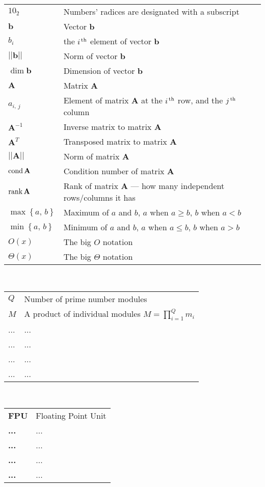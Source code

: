 \begin{tabular}{ll}
$10_2$ & Numbers' radices are designated with a subscript \\
${\mathbf b}$ & Vector $\mathbf b$\\
$b_{i}$ & the $i^{\,{\rm th}}$ element of vector $\mathbf b$\\
${||\mathbf b||}$ & Norm of vector $\mathbf b$\\
$\dim \mathbf b$ & Dimension of vector $\mathbf b$\\
${\mathbf A}$ & Matrix $\mathbf A$\\
$a_{i,\,j}$ & Element of matrix $\mathbf A$ at the $i^{\,{\rm th}}$ row, and the $j^{\,{\rm th}}$ column\\
${\mathbf A^{-1}}$ & Inverse matrix to matrix $\mathbf A$\\
${\mathbf A^T}$ & Transposed matrix to matrix $\mathbf A$\\
${||\mathbf A||}$ & Norm of matrix $\mathbf A$\\
$\mathop{\mathrm{cond}}\nolimits \mathbf A$ & Condition number of matrix $\mathbf A$\\
$\mathop{\mathrm{rank}}\nolimits \mathbf A$ & Rank of matrix $\mathbf A$ --- how many independent rows/columns it has\\
$\max\left\{a,\,b\right\}$ & Maximum of $a$ and $b$, $a$ when $a\geq b$, $b$ when $a<b$\\
$\min\left\{a,\,b\right\}$ & Minimum of $a$ and $b$, $a$ when $a\leq b$, $b$ when $a>b$\\
$O(x)$ & The big $O$ notation\\
$\Theta(x)$ & The big $\Theta$ notation\\
\end{tabular}
\newpage

\\

\begin{tabular}{ll}
$Q$ & Number of prime number modules\\
$M$ & A product of individual modules $M=\prod\limits_{i=1}^Q m_i$\\
... & ...\\
... & ...\\
... & ...\\
... & ...\\
\end{tabular}
\vskip 1cm

\\

\begin{tabular}{ll}
{\bf FPU} & Floating Point Unit\\
{\bf ...} & ...\\
{\bf ...} & ...\\
{\bf ...} & ...\\
{\bf ...} & ...\\
\end{tabular}
\vskip 1cm
